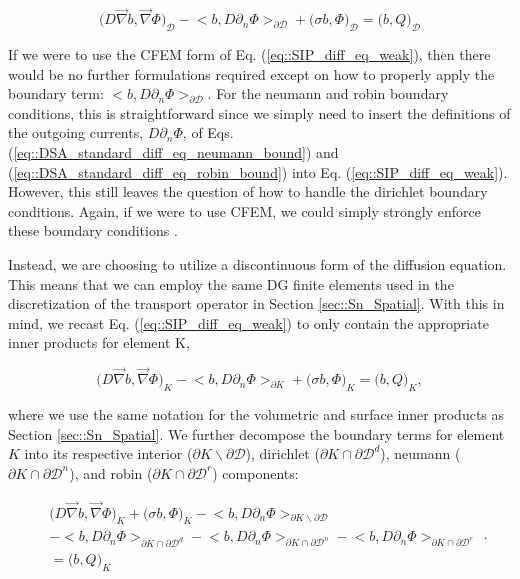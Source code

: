 \begin{equation}
\label{eq::SIP_diff_eq_weak}
\Big(  D \vec{\nabla}  b , \vec{\nabla} \Phi  \Big)_{\mathcal{D}} - \Big<  b, D \partial_n \Phi \Big>_{\partial \mathcal{D}} + \Big(  \sigma   b ,  \Phi  \Big)_{\mathcal{D}}  = \Big(  b, Q  \Big)_{\mathcal{D}}
\end{equation}

\noindent If we were to use the CFEM form of Eq. (\ref{eq::SIP_diff_eq_weak}), then there would be no further formulations required except on how to properly apply the boundary term: $\Big<  b, D \partial_n \Phi \Big>_{\partial \mathcal{D}}$. For the neumann and robin boundary conditions, this is straightforward since we simply need to insert the definitions of the outgoing currents, $ D \partial_n \Phi$, of Eqs. (\ref{eq::DSA_standard_diff_eq_neumann_bound}) and (\ref{eq::DSA_standard_diff_eq_robin_bound}) into Eq. (\ref{eq::SIP_diff_eq_weak}). However, this still leaves the question of how to handle the dirichlet boundary conditions. Again, if we were to use CFEM, we could simply strongly enforce these boundary conditions \cite{akin1982application}.

Instead, we are choosing to utilize a discontinuous form of the diffusion equation. This means that we can employ the same DG finite elements used in the discretization of the transport operator in Section \ref{sec::Sn_Spatial}. With this in mind, we recast Eq. (\ref{eq::SIP_diff_eq_weak}) to only contain the appropriate inner products for element K,

\begin{equation}
\label{eq::SIP_diff_eq_weak_cellK}
\Big(  D \vec{\nabla}  b , \vec{\nabla} \Phi  \Big)_{K} - \Big<  b, D \partial_n \Phi \Big>_{\partial K} + \Big(  \sigma   b ,  \Phi  \Big)_{K}  = \Big(  b, Q  \Big)_{K} ,
\end{equation}

\noindent where we use the same notation for the volumetric and surface inner products as Section \ref{sec::Sn_Spatial}. We further decompose the boundary terms for element $K$ into its respective interior ($\partial K \backslash \partial \mathcal{D}$), dirichlet ($\partial	K \cap \partial \mathcal{D}^d$), neumann ($\partial	K \cap \partial \mathcal{D}^n$), and robin ($\partial	K \cap \partial \mathcal{D}^r$) components:

\begin{equation}
\label{eq::SIP_diff_eq_weak_cellK_wbounds}
\begin{aligned}
&\Big(  D \vec{\nabla}  b , \vec{\nabla} \Phi  \Big)_{K}  + \Big(  \sigma   b ,  \Phi  \Big)_{K}   - \Big<  b, D \partial_n \Phi \Big>_{\partial K \backslash \partial \mathcal{D}}   \\
 &- \Big<  b, D \partial_n \Phi \Big>_{\partial	K \cap \partial \mathcal{D}^d} - \Big<  b, D \partial_n \Phi \Big>_{\partial	K \cap \partial \mathcal{D}^n}  - \Big<  b, D \partial_n \Phi \Big>_{\partial	K \cap \partial \mathcal{D}^r} \\
&= \Big(  b, Q  \Big)_{K} 
\end{aligned} .
\end{equation}

